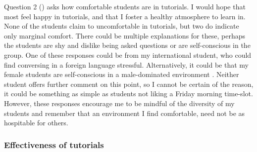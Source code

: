 Question 2 () asks how comfortable students are in tutorials. I would hope that most feel happy in tutorials, and that I foster a healthy atmosphere to learn in. None of the students claim to uncomfortable in tutorials, but two do indicate only marginal comfort. There could be multiple explanations for these, perhaps the students are shy and dislike being asked questions or are self-conscious in the group. One of these responses could be from my international student, who could find conversing in a foreign language stressful. Alternatively, it could be that my female students are self-conscious in a male-dominated environment \citep{Gonsalves2014,Gonsalves2014a}. Neither student offers further comment on this point, so I cannot be certain of the reason, it could be something as simple as students not liking a Friday morning time-slot. However, these responses encourage me to be mindful of the diversity of my students and remember that an environment I find comfortable, need not be as hospitable for others.

\subsubsection{Effectiveness of tutorials}\label{sec:tutorial-effect}

